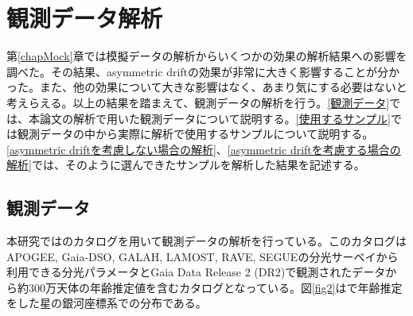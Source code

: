 \chapter{観測データ解析 \label{chapObs}}

第\ref{chapMock}章では模擬データの解析からいくつかの効果の解析結果への影響を調べた。その結果、asymmetric driftの効果が非常に大きく影響することが分かった。また、他の効果について大きな影響はなく、あまり気にする必要はないと考えらえる。以上の結果を踏まえて、観測データの解析を行う。\ref{観測データ}では、本論文の解析で用いた観測データについて説明する。\ref{使用するサンプル}では観測データの中から実際に解析で使用するサンプルについて説明する。\ref{asymmetric driftを考慮しない場合の解析}、\ref{asymmetric driftを考慮する場合の解析}では、そのように選んできたサンプルを解析した結果を記述する。

\section{観測データ \label{観測データ}}
本研究では\cite{SD18}のカタログを用いて観測データの解析を行っている。このカタログはAPOGEE, Gaia-DSO, GALAH, LAMOST, RAVE, SEGUEの分光サーベイから利用できる分光パラメータとGaia Data Release 2 (DR2)で観測されたデータから約300万天体の年齢推定値を含むカタログとなっている。図\ref{fig2}は\cite{SD18}で年齢推定をした星の銀河座標系での分布である。

